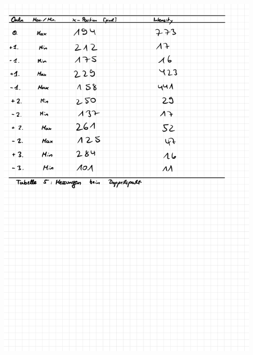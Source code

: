 \documentclass{article}
\begin{document}
\includegraphics[width=\textwidth]{graphics/messprotokoll/233 - Fourieroptik-9.jpg}
\newpage
\end{document}
